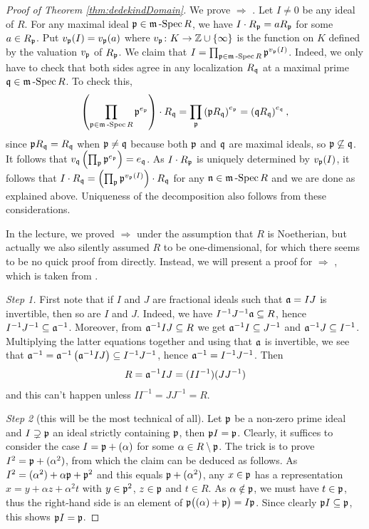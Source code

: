 \documentclass[a4paper,parskip=half,numbers=enddot, DIV=12, headheight=30pt]{scrreprt}
\begin{document}
\begin{proof}[Proof of Theorem \ref{thm:dedekindDomain}]
We prove  $\Rightarrow$ . Let $I\neq 0$ be any ideal of $R$. For any maximal ideal $\pp\in \mSpec R$, we have $I\cdot R_\pp = a R_\pp$
for some $a\in R_\pp$. Put $v_\pp(I) = v_\pp(a)$ where $v_\pp\colon K\morphism \mathbb Z\cup \{\infty\}$ is the
function on $K$ defined by the valuation $v_\pp$ of $R_\pp$.
We claim that $I=\prod_{\pp\in \mSpec R} \pp^{v_\pp(I)}$. Indeed, we only have to check that both sides agree in any localization $R_\qq$ at a maximal prime $\qq\in\mSpec R$. To check this,
\begin{align*}
\left(\prod_{\pp\in \mSpec R} \pp^{e_\pp}\right)\cdot R_\qq = \prod_{\pp}\left(\pp R_\qq\right)^{e_\pp} = \left(\qq R_\qq\right)^{e_\qq},
\end{align*}
since $\pp R_\qq = R_\qq$ when $\pp\neq \qq$ because
both $\pp$ and $\qq$ are maximal ideals, so $\pp\not\subseteq \qq$.
It follows that $v_\qq\left(\prod_\pp \pp^{e_\pp}\right) = e_\qq$. As $I\cdot R_\pp$ is uniquely determined by $v_\pp(I)$, it follows
that $I\cdot R_\qq = \left(\prod_\pp \pp^{v_\pp(I)}\right)\cdot R_\qq$ for any $\nn\in \mSpec R$ and we are done as explained above.
Uniqueness of the decomposition
also follows from these considerations.


In the lecture, we proved  $\Rightarrow$  under the assumption that $R$ is Noetherian, but actually we also silently assumed $R$ to be one-dimensional, for which there seems to be no quick proof from  directly. Instead, we will present a proof for  $\Rightarrow$ , which is taken from \cite[pp.~83-84]{matsumuraCRT}. 

\emph{Step 1.} First note that if $I$ and $J$ are fractional ideals such that $\aa=IJ$ is invertible, then so are $I$ and $J$. Indeed, we have $I^{-1}J^{-1}\aa\subseteq R$, hence $I^{-1}J^{-1}\subseteq \aa^{-1}$. Moreover, from $\aa^{-1}IJ\subseteq R$ we get $\aa^{-1}I\subseteq J^{-1}$ and $\aa^{-1}J\subseteq I^{-1}$. Multiplying the latter equations together and using that $\aa$ is invertible, we see that $\aa^{-1}=\aa^{-1}\left(\aa^{-1}IJ\right)\subseteq I^{-1}J^{-1}$, hence $\aa^{-1}=I^{-1}J^{-1}$. Then
\begin{align*}
	R=\aa^{-1}IJ=(II^{-1})(JJ^{-1})
\end{align*}
and this can't happen unless $II^{-1}=JJ^{-1}=R$.

\emph{Step 2} (this will be the most technical of all). Let $\pp$ be a non-zero prime ideal and $I\supsetneq\pp$ an ideal strictly containing $\pp$, then $\pp I=\pp$. Clearly, it suffices to consider the case $I=\pp+(\alpha)$ for some $\alpha\in R\setminus \pp$. The trick is to prove $I^2=\pp+(\alpha^2)$, from which the claim can be deduced as follows. As $I^2=(\alpha^2)+\alpha\pp+\pp^2$ and this equals $\pp+(\alpha^2)$, any $x\in\pp$ has a representation $x=y+\alpha z+\alpha^2t$ with $y\in\pp^2$, $z\in \pp$ and $t\in R$. As $\alpha\notin\pp$, we must have $t\in \pp$, thus the right-hand side is an element of $\pp\big((\alpha)+\pp\big)=I\pp$. Since clearly $\pp I\subseteq\pp$, this shows $\pp I=\pp$.


\end{proof}
\end{document}
